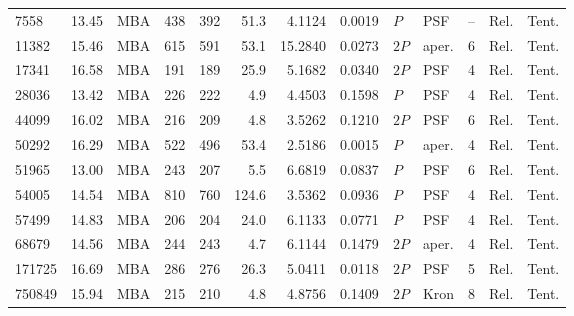 \begin{table}[!p]
\begin{tabular}{lrlrrrrrlllll}
7558 & 13.45 & MBA & 438 & 392 & 51.3 & 4.1124 & 0.0019 & $P$ & PSF & -- & Rel. & Tent. \\
11382 & 15.46 & MBA & 615 & 591 & 53.1 & 15.2840 & 0.0273 & $2P$ & aper. & 6 & Rel. & Tent. \\
17341 & 16.58 & MBA & 191 & 189 & 25.9 & 5.1682 & 0.0340 & $2P$ & PSF & 4 & Rel. & Tent. \\
28036 & 13.42 & MBA & 226 & 222 & 4.9 & 4.4503 & 0.1598 & $P$ & PSF & 4 & Rel. & Tent. \\
44099 & 16.02 & MBA & 216 & 209 & 4.8 & 3.5262 & 0.1210 & $2P$ & PSF & 6 & Rel. & Tent. \\
50292 & 16.29 & MBA & 522 & 496 & 53.4 & 2.5186 & 0.0015 & $P$ & aper. & 4 & Rel. & Tent. \\
51965 & 13.00 & MBA & 243 & 207 & 5.5 & 6.6819 & 0.0837 & $P$ & PSF & 6 & Rel. & Tent. \\
54005 & 14.54 & MBA & 810 & 760 & 124.6 & 3.5362 & 0.0936 & $P$ & PSF & 4 & Rel. & Tent. \\
57499 & 14.83 & MBA & 206 & 204 & 24.0 & 6.1133 & 0.0771 & $P$ & PSF & 4 & Rel. & Tent. \\
68679 & 14.56 & MBA & 244 & 243 & 4.7 & 6.1144 & 0.1479 & $2P$ & aper. & 4 & Rel. & Tent. \\
171725 & 16.69 & MBA & 286 & 276 & 26.3 & 5.0411 & 0.0118 & $2P$ & PSF & 5 & Rel. & Tent. \\
750849 & 15.94 & MBA & 215 & 210 & 4.8 & 4.8756 & 0.1409 & $2P$ & Kron & 8 & Rel. & Tent. \\
\bottomrule
\end{tabular}
\end{table}
